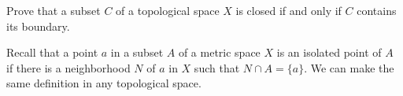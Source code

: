 \begin{comment}

\ExerciseSolution

	\ba
	\item Since any two open sets in $(X, \tau_p)$ must contain $p$, it is impossible to find disjoint open sets. So $(X, \tau_p)$ is not a Hausdorff space. 
	
	\item The only open set that contains $p$ is $X$, so it is impossible to find two disjoint open sets that separate $p$ from any other element of $X$. So $(X, \tau_{\overline{p}})$ is not Hausdorff. 
	
	\ea

\end{comment}

\item \label{ex:TS_Closed_boundary} Prove that a subset $C$ of a topological space $X$ is closed if and only if $C$ contains its boundary. 


\begin{comment}

\ExxerciseSolution Let $X$ be a topological space, and let $C$ be a subset of $X$. First we assume that $C$ is closed and show that $C$ contains its boundary. Let $x \in X$ be a boundary point of $C$. We proceed by contradiction and assume that $x \notin C$. Then $x \in X \setminus C$, which is an open set. But then this neighborhood $X \setminus C$ contains no points in $C$, which contradicts the fact that $x$ is a boundary point of $C$. We conclude that $x \in C$ and $C$ contains its boundary.

For the converse, assume that $C$ contains its boundary. To show that $C$ is closed, we prove that $C$ contains its limit points. Let $x$ be a limits point of $C$. To show that $x \in C$, assume to the contrary that $x \notin C$. Then $x \in X \setminus C$, an open set. Since $X \setminus C$ is a neighborhood of each of its points, the fact that $x$ is a limit point of $C$ implies that $X \setminus C$ must contain a point of $C$, a contradiction. We conclude that $x \in C$ and $C$ contains its limit points. Therefore, $C$ is closed. 

\end{comment}

\item Recall that a point $a$ in a subset $A$ of a metric space $X$ is an isolated point of $A$ if there is a neighborhood $N$ of $a$ in $X$ such that $N \cap A = \{a\}$. We can make the same definition in any topological space.

